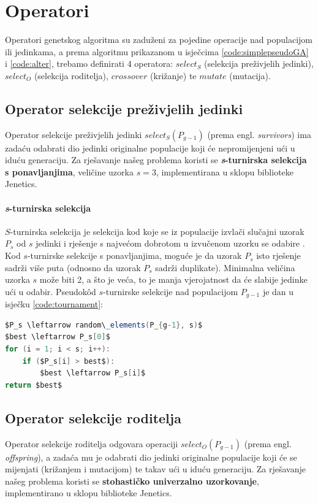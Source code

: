 \documentclass[times, utf8, zavrsni]{fer}
\begin{document}
\section{Operatori}
Operatori genetskog algoritma su zaduženi za pojedine operacije nad populacijom ili jedinkama, a prema algoritmu prikazanom u isječcima \ref{code:simplepseudoGA} i \ref{code:alter}, trebamo definirati 4 operatora: $select_S$ (selekcija preživjelih jedinki), $select_O$ (selekcija roditelja), $crossover$ (križanje) te $mutate$ (mutacija).

\subsection{Operator selekcije preživjelih jedinki}
Operator selekcije preživjelih jedinki $select_S(P_{g-1})$ (prema engl. \textit{survivors}) ima zadaću odabrati dio jedinki originalne populacije koji će nepromijenjeni ući u iduću generaciju. Za rješavanje našeg problema koristi se \textbf{\textit{s}-turnirska selekcija s ponavljanjima}, veličine uzorka $s = 3$, implementirana u sklopu biblioteke Jenetics.

\paragraph{\textit{s}-turnirska selekcija} $S$-turnirska selekcija je selekcija kod koje se iz populacije izvlači slučajni uzorak $P_s$ od $s$ jedinki i rješenje s najvećom dobrotom u izvučenom uzorku se odabire \citep{book:cupic_optjava}. Kod $s$-turnirske selekcije s ponavljanjima, moguće je da uzorak $P_s$ isto rješenje sadrži više puta (odnosno da uzorak $P_s$ sadrži duplikate). Minimalna veličina uzorka $s$ može biti 2, a što je veća, to je manja vjerojatnost da će slabije jedinke ući u odabir. Pseudok\^{o}d $s$-turnirske selekcije nad populacijom $P_{g-1}$ je dan u isječku \ref{code:tournament}:

\begin{lstlisting}[language=java, caption=$s$-turnirska selekcija, label={code:tournament}, mathescape]
$P_s \leftarrow random\_elements(P_{g-1}, s)$
$best \leftarrow P_s[0]$
for (i = 1; i < s; i++):
	if ($P_s[i] > best$):
		$best \leftarrow P_s[i]$
return $best$
\end{lstlisting}

\subsection{Operator selekcije roditelja}
Operator selekcije roditelja odgovara operaciji $select_O(P_{g-1})$ (prema engl. \textit{offspring}), a zadaća mu je odabrati dio jedinki originalne populacije koji će se mijenjati (križanjem i mutacijom) te takav ući u iduću generaciju. Za rješavanje našeg problema koristi se \textbf{stohastičko univerzalno uzorkovanje}, implementirano u sklopu biblioteke Jenetics.
\end{document}

